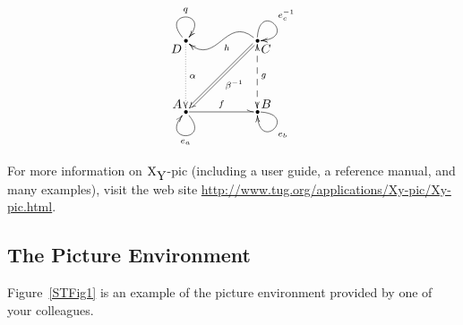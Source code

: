 \[
\begin{xy}
<1cm,0cm>:(0,0)*+@{*}="a"*+!DR{A}, "a"   %
\ar@(dr,dl)^{e_a}  %
\ar@{^>}^f (2,0)*+@{*}="b"*+!DL{B}, "b"  %
\ar@(r,d)^{e_b} "b"; "b" %
\ar@{<-->}_{g} "b"; (2,2)*+@{*}="c"*+!UL{C}, "c"  %
\ar@(u,r)^{e^{-1}_c} "c"; "c"  %
\ar@(ul,dr)^{h} "c"; (0,2)*+@{*}="d"*+!UR{D}, "d"  %
\ar@(ul,ur)^{q} "d"; "d" %
\ar@{.>}^{\alpha} "d"; "a"  %
\ar@{=>}^{\beta^{-1}} "c"; "a"  %
\end{xy}
\]

For more information on $\text{X}_\text{\normalsize Y}$-pic (including a
user guide, a reference manual, and many examples), visit the web site
\url{http://www.tug.org/applications/Xy-pic/Xy-pic.html}.

\subsection{The Picture Environment}

Figure~\ref{STFig1} is an example of the picture environment provided by one
of your colleagues.

